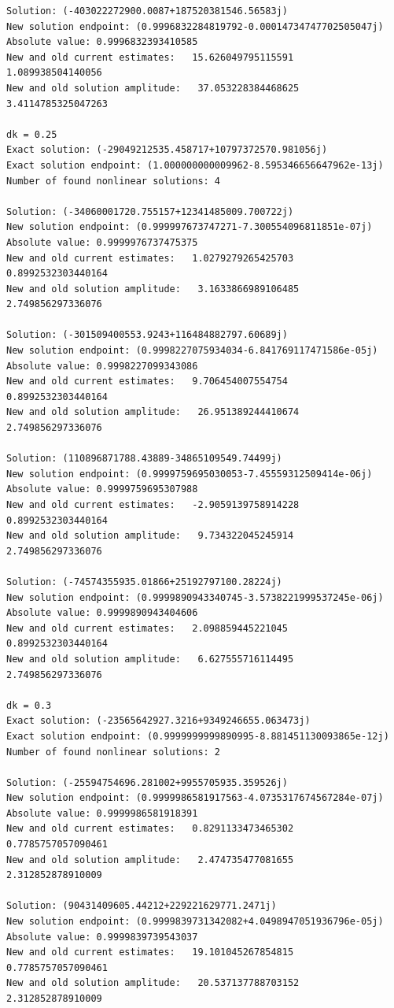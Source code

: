 \documentclass{article}
\begin{document}
\begin{verbatim}
Solution: (-403022272900.0087+187520381546.56583j)
New solution endpoint: (0.9996832284819792-0.00014734747702505047j) Absolute value: 0.9996832393410585
New and old current estimates:   15.626049795115591    1.089938504140056
New and old solution amplitude:   37.053228384468625    3.4114785325047263

dk = 0.25
Exact solution: (-29049212535.458717+10797372570.981056j)
Exact solution endpoint: (1.000000000009962-8.595346656647962e-13j)
Number of found nonlinear solutions: 4

Solution: (-34060001720.755157+12341485009.700722j)
New solution endpoint: (0.999997673747271-7.300554096811851e-07j) Absolute value: 0.9999976737475375
New and old current estimates:   1.0279279265425703    0.8992532303440164
New and old solution amplitude:   3.1633866989106485    2.749856297336076

Solution: (-301509400553.9243+116484882797.60689j)
New solution endpoint: (0.9998227075934034-6.841769117471586e-05j) Absolute value: 0.9998227099343086
New and old current estimates:   9.706454007554754    0.8992532303440164
New and old solution amplitude:   26.951389244410674    2.749856297336076

Solution: (110896871788.43889-34865109549.74499j)
New solution endpoint: (0.9999759695030053-7.45559312509414e-06j) Absolute value: 0.9999759695307988
New and old current estimates:   -2.9059139758914228    0.8992532303440164
New and old solution amplitude:   9.734322045245914    2.749856297336076

Solution: (-74574355935.01866+25192797100.28224j)
New solution endpoint: (0.9999890943340745-3.5738221999537245e-06j) Absolute value: 0.9999890943404606
New and old current estimates:   2.098859445221045    0.8992532303440164
New and old solution amplitude:   6.627555716114495    2.749856297336076

dk = 0.3
Exact solution: (-23565642927.3216+9349246655.063473j)
Exact solution endpoint: (0.9999999999890995-8.881451130093865e-12j)
Number of found nonlinear solutions: 2

Solution: (-25594754696.281002+9955705935.359526j)
New solution endpoint: (0.9999986581917563-4.0735317674567284e-07j) Absolute value: 0.9999986581918391
New and old current estimates:   0.8291133473465302    0.7785757057090461
New and old solution amplitude:   2.474735477081655    2.312852878910009

Solution: (90431409605.44212+229221629771.2471j)
New solution endpoint: (0.9999839731342082+4.0498947051936796e-05j) Absolute value: 0.9999839739543037
New and old current estimates:   19.101045267854815    0.7785757057090461
New and old solution amplitude:   20.537137788703152    2.312852878910009


\end{verbatim}
\end{document}
